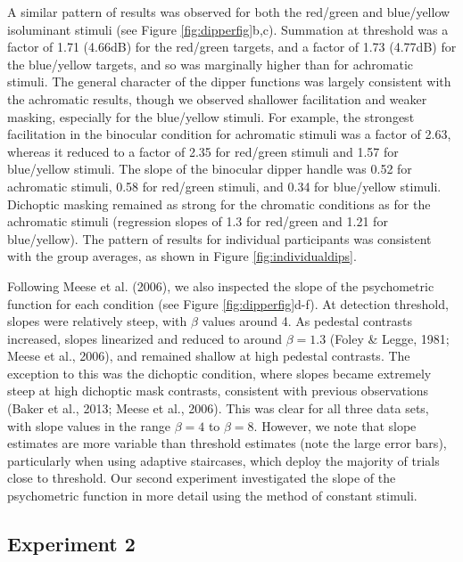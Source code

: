 \documentclass[
]{article}
\begin{document}
A similar pattern of results was observed for both the red/green and blue/yellow isoluminant stimuli (see Figure \ref{fig:dipperfig}b,c). Summation at threshold was a factor of 1.71 (4.66dB) for the red/green targets, and a factor of 1.73 (4.77dB) for the blue/yellow targets, and so was marginally higher than for achromatic stimuli. The general character of the dipper functions was largely consistent with the achromatic results, though we observed shallower facilitation and weaker masking, especially for the blue/yellow stimuli. For example, the strongest facilitation in the binocular condition for achromatic stimuli was a factor of 2.63, whereas it reduced to a factor of 2.35 for red/green stimuli and 1.57 for blue/yellow stimuli. The slope of the binocular dipper handle was 0.52 for achromatic stimuli, 0.58 for red/green stimuli, and 0.34 for blue/yellow stimuli. Dichoptic masking remained as strong for the chromatic conditions as for the achromatic stimuli (regression slopes of 1.3 for red/green and 1.21 for blue/yellow). The pattern of results for individual participants was consistent with the group averages, as shown in Figure \ref{fig:individualdips}.

Following Meese et al. (2006), we also inspected the slope of the psychometric function for each condition (see Figure \ref{fig:dipperfig}d-f). At detection threshold, slopes were relatively steep, with \(\beta\) values around 4. As pedestal contrasts increased, slopes linearized and reduced to around \(\beta=1.3\) (Foley \& Legge, 1981; Meese et al., 2006), and remained shallow at high pedestal contrasts. The exception to this was the dichoptic condition, where slopes became extremely steep at high dichoptic mask contrasts, consistent with previous observations (Baker et al., 2013; Meese et al., 2006). This was clear for all three data sets, with slope values in the range \(\beta=4\) to \(\beta=8\). However, we note that slope estimates are more variable than threshold estimates (note the large error bars), particularly when using adaptive staircases, which deploy the majority of trials close to threshold. Our second experiment investigated the slope of the psychometric function in more detail using the method of constant stimuli.

\hypertarget{experiment-2}{%
\subsection{Experiment 2}\label{experiment-2}}
\end{document}
